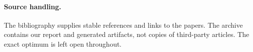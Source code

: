 \paragraph{Source handling.}
The bibliography supplies stable references and links to the papers.
The archive contains our report and generated artifacts, not copies of
third-party articles. The exact optimum is left open throughout.
